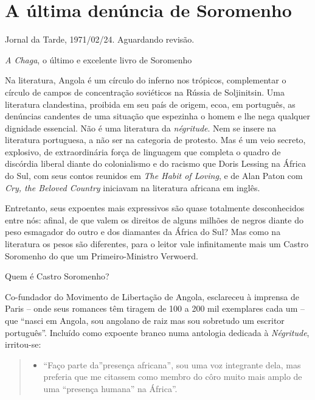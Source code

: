 \documentclass[
  letterpaper,
  DIV=11,
  numbers=noendperiod]{scrreprt}
\providecommand{\tightlist}{%
  \setlength{\itemsep}{0pt}\setlength{\parskip}{0pt}}\usepackage{longtable,booktabs,array}
\begin{document}
\chapter{A última denúncia de
Soromenho}\label{a-uxfaltima-denuxfancia-de-soromenho}

Jornal da Tarde, 1971/02/24. Aguardando revisão.

\hfill\break

\emph{A Chaga}, o último e excelente livro de Soromenho

Na literatura, Angola é um círculo do inferno nos trópicos, complementar
o círculo de campos de concentração soviéticos na Rússia de Soljinitsin.
Uma literatura clandestina, proibida em seu país de origem, ecoa, em
português, as denúncias candentes de uma situação que espezinha o homem
e lhe nega qualquer dignidade essencial. Não é uma literatura da
\emph{négritude}. Nem se insere na literatura portuguesa, a não ser na
categoria de protesto. Mas é um veio secreto, explosivo, de
extraordinária força de linguagem que completa o quadro de discórdia
liberal diante do colonialismo e do racismo que Doris Lessing na África
do Sul, com seus contos reunidos em \emph{The Habit of Loving}, e de
Alan Paton com \emph{Cry, the Beloved Country} iniciavam na literatura
africana em inglês.

Entretanto, seus expoentes mais expressivos são quase totalmente
desconhecidos entre nós: afinal, de que valem os direitos de alguns
milhões de negros diante do peso esmagador do outro e dos diamantes da
África do Sul? Mas como na literatura os pesos são diferentes, para o
leitor vale infinitamente mais um Castro Soromenho do que um
Primeiro-Ministro Verwoerd.

Quem é Castro Soromenho?

Co-fundador do Movimento de Libertação de Angola, esclareceu à imprensa
de Paris -- onde seus romances têm tiragem de 100 a 200 mil exemplares
cada um -- que ``nasci em Angola, sou angolano de raiz mas sou sobretudo
um escritor português''. Incluído como expoente branco numa antologia
dedicada à \emph{Négritude}, irritou-se:

\begin{quote}
\begin{itemize}
\tightlist
\item
  ``Faço parte da''presença africana'', sou uma voz integrante dela, mas
  preferia que me citassem como membro do côro muito mais amplo de uma
  ``presença humana'' na África''.
\end{itemize}
\end{quote}
\end{document}
